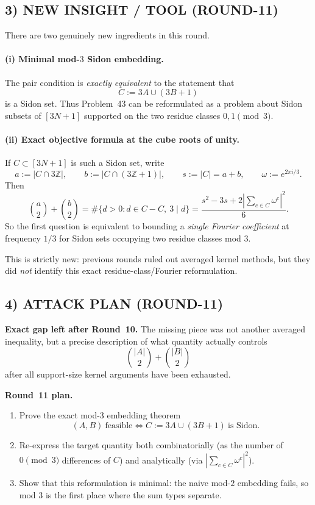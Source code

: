 \subsection{3) NEW INSIGHT / TOOL (ROUND-11)}

There are two genuinely new ingredients in this round.

\paragraph{(i) Minimal mod-$3$ Sidon embedding.}
The pair condition is \emph{exactly equivalent} to the statement that
\[
C:=3A\cup (3B+1)
\]
is a Sidon set.  Thus Problem~43 can be reformulated as a problem about Sidon subsets of $[3N+1]$ supported on the two residue classes $0,1\pmod 3$.

\paragraph{(ii) Exact objective formula at the cube roots of unity.}
If $C\subset [3N+1]$ is such a Sidon set, write
\[
a:=|C\cap 3\mathbb Z|,
\qquad
b:=|C\cap (3\mathbb Z+1)|,
\qquad
s:=|C|=a+b,
\qquad
\omega:=e^{2\pi i/3}.
\]
Then
\[
\binom{a}{2}+\binom{b}{2}
=
\#\{d>0:d\in C-C,\ 3\mid d\}
=
\frac{s^2-3s+2\left|\sum_{c\in C}\omega^c\right|^2}{6}.
\]
So the first question is equivalent to bounding a \emph{single Fourier coefficient} at frequency $1/3$ for Sidon sets occupying two residue classes mod $3$.

This is strictly new: previous rounds ruled out averaged kernel methods, but they did \emph{not} identify this exact residue-class/Fourier reformulation.

\subsection{4) ATTACK PLAN (ROUND-11)}

\textbf{Exact gap left after Round~10.}
The missing piece was not another averaged inequality, but a precise description of what quantity actually controls
\[
\binom{|A|}{2}+\binom{|B|}{2}
\]
after all support-size kernel arguments have been exhausted.

\textbf{Round~11 plan.}
\begin{enumerate}
\item Prove the exact mod-$3$ embedding theorem
\[
(A,B)\ \text{feasible} \iff C:=3A\cup(3B+1)\ \text{is Sidon}.
\]
\item Re-express the target quantity both combinatorially (as the number of $0\pmod 3$ differences of $C$) and analytically (via $|\sum_{c\in C}\omega^c|^2$).
\item Show that this reformulation is minimal: the naive mod-$2$ embedding fails, so mod $3$ is the first place where the sum types separate.
\end{enumerate}

